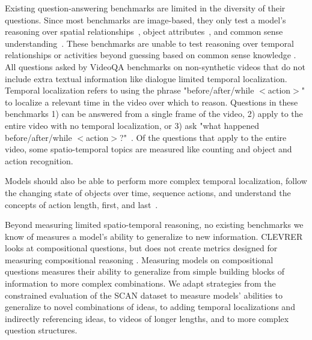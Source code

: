 Existing question-answering benchmarks are limited in the diversity of their questions. Since most benchmarks are image-based, they only test a model's reasoning over spatial relationships~\cite{johnson2017clevr,hudson2019gqa,antol2015vqa,goyal2017making,krishna2017visual,zhu2016visual7w}, object attributes~\cite{johnson2017clevr,hudson2019gqa, antol2015vqa,goyal2017making,krishna2017visual}, and common sense understanding~\cite{zellers2019recognition,antol2015vqa,krishna2017visual}. These benchmarks are unable to test reasoning over temporal relationships or activities beyond guessing based on common sense knowledge \cite{zellers2019recognition}. All questions asked by VideoQA benchmarks on non-synthetic videos that do not include extra textual information like dialogue limited temporal localization. Temporal localization refers to using the phrase "before/after/while $<$action$>$" to localize a relevant time in the video over which to reason. Questions in these benchmarks 1) can be answered from a single frame of the video, 2) apply to the entire video with no temporal localization, or 3) ask "what happened before/after/while $<$action$>$?"~\cite{jang2017tgif,xu2017video, maharaj2017dataset, zeng2016leveraging, yu2019activitynet}. Of the questions that apply to the entire video, some spatio-temporal topics are measured like counting and object and action recognition.


 
Models should also be able to perform more complex temporal localization, follow the changing state of objects over time, sequence actions, and understand the concepts of action length, first, and last~\cite{lake2018generalization,vatashsky2020vqa}.

Beyond measuring limited spatio-temporal reasoning, no existing benchmarks we know of measures a model's ability to generalize to new information. CLEVRER looks at compositional questions, but does not create metrics designed for measuring compositional reasoning \cite{yi2019clevrer}. Measuring models on compositional questions measures their ability to generalize from simple building blocks of information to more complex combinations. We adapt strategies from the constrained evaluation of the SCAN dataset \cite{lake2018generalization} to measure models' abilities to generalize to novel combinations of ideas, to adding temporal localizations and indirectly referencing ideas, to videos of longer lengths, and to more complex question structures.

